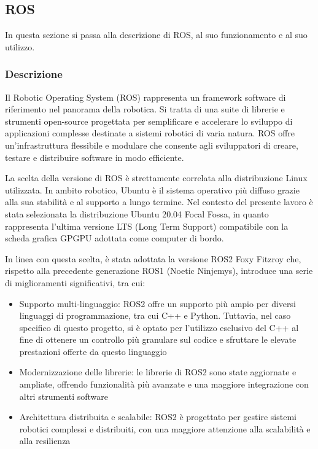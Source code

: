 \subsection{ROS}
In questa sezione si passa alla descrizione di ROS, al suo funzionamento e al suo utilizzo.

\subsubsection{Descrizione}
Il Robotic Operating System (ROS) rappresenta un framework software di riferimento nel panorama della robotica. Si tratta di una suite di librerie e strumenti open-source progettata per semplificare e accelerare lo sviluppo di applicazioni complesse destinate a sistemi robotici di varia natura. ROS offre un'infrastruttura flessibile e modulare che consente agli sviluppatori di creare, testare e distribuire software in modo efficiente.

\noindent La scelta della versione di ROS è strettamente correlata alla distribuzione Linux utilizzata. In ambito robotico, Ubuntu è il sistema operativo più diffuso grazie alla sua stabilità e al supporto a lungo termine. Nel contesto del presente lavoro è stata selezionata la distribuzione Ubuntu 20.04 Focal Fossa, in quanto rappresenta l'ultima versione LTS (Long Term Support) compatibile con la scheda grafica GPGPU adottata come computer di bordo.

\noindent In linea con questa scelta, è stata adottata la versione ROS2 Foxy Fitzroy che, rispetto alla precedente generazione ROS1 (Noetic Ninjemys), introduce una serie di miglioramenti significativi, tra cui:

\begin{itemize}
  \item Supporto multi-linguaggio: ROS2 offre un supporto più ampio per diversi linguaggi di programmazione, tra cui C++ e Python. Tuttavia, nel caso specifico di questo progetto, si è optato per l'utilizzo esclusivo del C++ al fine di ottenere un controllo più granulare sul codice e sfruttare le elevate prestazioni offerte da questo linguaggio
  \item Modernizzazione delle librerie: le librerie di ROS2 sono state aggiornate e ampliate, offrendo funzionalità più avanzate e una maggiore integrazione con altri strumenti software
  \item Architettura distribuita e scalabile: ROS2 è progettato per gestire sistemi robotici complessi e distribuiti, con una maggiore attenzione alla scalabilità e alla resilienza
\end{itemize}

